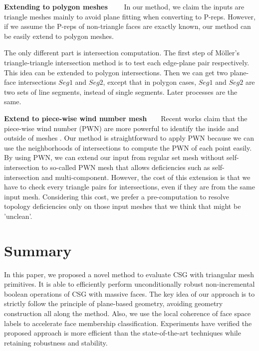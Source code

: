 \documentclass[10pt,journal,compsoc]{IEEEtran}
\begin{document}
\vspace{0.5em}
\noindent\textbf{Extending to polygon meshes}~~~~
In our method, we claim the inputs are triangle meshes mainly to avoid plane fitting when converting to P-reps. However, if we assume the P-reps of non-triangle faces are exactly known, our method can be easily extend to polygon meshes.


\vspace{0.5em}\noindent The only different part is intersection computation. The first step of M\"{o}ller's triangle-triangle intersection method is to test each edge-plane pair respectively. This idea can be extended to polygon intersections. Then we can get two plane-face intersections $Seg1$ and $Seg2$, except that in polygon cases, $Seg1$ and $Seg2$ are two sets of line segments, instead of single segments. Later processes are the same.

\vspace{0.5em}
\noindent\textbf{Extend to piece-wise wind number mesh}~~~~Recent works claim that the piece-wise wind number (PWN) are more powerful to identify the inside and outside of meshes \cite{zhou2016mesh}. Our method is straightforward to apply PWN because we can use the neighborhoods of intersections to compute the PWN of each point easily. By using PWN, we can extend our input from regular set mesh without self-intersection to so-called PWN mesh that allows deficiencies such as self-intersection and multi-component. However, the cost of this extension is that we have to check every triangle pairs for intersections, even if they are from the same input mesh. Considering this cost, we prefer a pre-computation to resolve topology deficiencies only on those input meshes that we think that might be 'unclean'.

\section{Summary}

In this paper, we proposed a novel method to evaluate CSG with triangular mesh primitives. It is able to efficiently perform unconditionally robust non-incremental boolean operations of CSG with massive faces. The key idea of our approach is to strictly follow the principle of plane-based geometry, avoiding geometry construction all along the method. Also, we use the local coherence of face space labels to accelerate face membership classification. Experiments have verified the proposed approach is more efficient than the state-of-the-art techniques while retaining robustness and stability.
\end{document}
